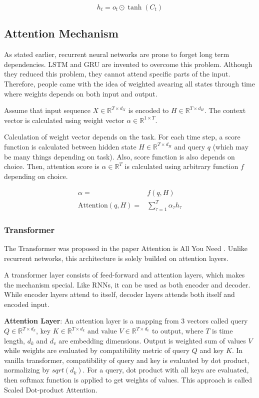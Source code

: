 \begin{equation}
h_t = o_t \odot \tanh(C_t)
\end{equation}

\subsection{Attention Mechanism}
As stated earlier, recurrent neural networks are prone to forget long term dependencies. LSTM and GRU are invented to overcome this problem. Although they reduced this problem, they cannot attend specific parts of the input. Therefore, people came with the idea of weighted avearing all states through time where weights depends on both input and output. 

Assume that input sequence $X \in \mathbb{R}^{T \times d_X}$ is encoded to $H \in \mathbb{R}^{T \times d_H}$. The context vector is calculated using weight vector $\alpha \in \mathbb{R}^{1 \times T}$. 

Calculation of weight vector depends on the task. For each time step, a score function is calculated between hidden state $H \in \mathbb{R}^{T \times d_H}$ and query $q$ (which may be many things depending on task). Also, score function is also depends on choice. Then, attention score is $\alpha \in \mathbb{R}^{T}$ is calculated using arbitrary function $f$ depending on choice.

\begin{equation}
\begin{split}
\alpha = & f(q, H) \\
\mathrm{Attention}(q, H) = & \sum_{\tau=1}^{T} \alpha_{\tau} h_{\tau}
\end{split}
\end{equation}


\subsubsection{Transformer}
The Transformer was proposed in the paper Attention is All You Need \cite{vaswani_attention_2017} . Unlike recurrent networks, this architecture is solely builded on attention layers. 

A transformer layer consists of feed-forward and attention layers, which makes the mechanism special. Like RNNs, it can be used as both encoder and decoder. While encoder layers attend to itself, decoder layers attends both itself and encoded input.

\textbf{Attention Layer}: An attention layer is a mapping from 3 vectors called query $Q \in \mathbb{R}^{T \times d_k}$, key $K \in \mathbb{R}^{T \times d_k}$ and value $V \in \mathbb{R}^{T \times d_v}$ to output, where $T$ is time length, $d_k$ and $d_v$ are embedding dimensions. Output is weighted sum of values $V$ while weights are evaluated by compatibility metric of query $Q$ and key $K$. In vanilla transformer, compatibility of query and key is evaluated by dot product, normalizing by $sqrt(d_k)$. For a query, dot product with all keys are evaluated, then softmax function is applied to get weights of values. This approach is called Scaled Dot-product Attention.

